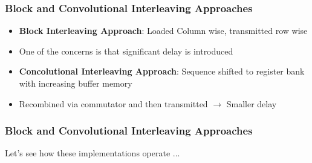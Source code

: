 \documentclass[10pt]{beamer}
\begin{document}
\frame
{
  \frametitle{Block and Convolutional Interleaving Approaches}

    \begin{itemize}
        \item \textbf{Block Interleaving Approach}: Loaded Column wise, transmitted row wise  
        \item One of the concerns is that significant delay is introduced
        \item \textbf{Concolutional Interleaving Approach}: Sequence shifted to register bank with increasing buffer memory
        \item Recombined via commutator and then transmitted $\rightarrow$ Smaller delay 
    \end{itemize}

}


\frame
{
  \frametitle{Block and Convolutional Interleaving Approaches}

Let's see how these implementations operate ...

}
\end{document}
